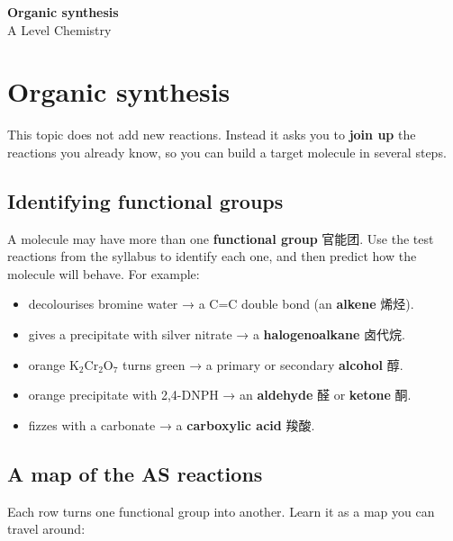 \documentclass[11pt]{article}
\begin{document}
\begin{center}
  {\LARGE\bfseries Organic synthesis}\\[0.35em]
  {\large A Level Chemistry}
\end{center}
\vspace{0.6em}

\section*{Organic synthesis}

This topic does not add new reactions. Instead it asks you to \textbf{join up} the reactions you already know, so you can build a target molecule in several steps.

\subsection*{Identifying functional groups}

A molecule may have more than one \textbf{functional group} 官能团. Use the test reactions from the syllabus to identify each one, and then predict how the molecule will behave. For example:

\begin{itemize}
\item decolourises bromine water → a C=C double bond (an \textbf{alkene} 烯烃).

\item gives a precipitate with silver nitrate → a \textbf{halogenoalkane} 卤代烷.

\item orange $\text{K}_2\text{Cr}_2\text{O}_7$ turns green → a primary or secondary \textbf{alcohol} 醇.

\item orange precipitate with 2,4-DNPH → an \textbf{aldehyde} 醛 or \textbf{ketone} 酮.

\item fizzes with a carbonate → a \textbf{carboxylic acid} 羧酸.

\end{itemize}

\subsection*{A map of the AS reactions}

Each row turns one functional group into another. Learn it as a map you can travel around:
\end{document}
